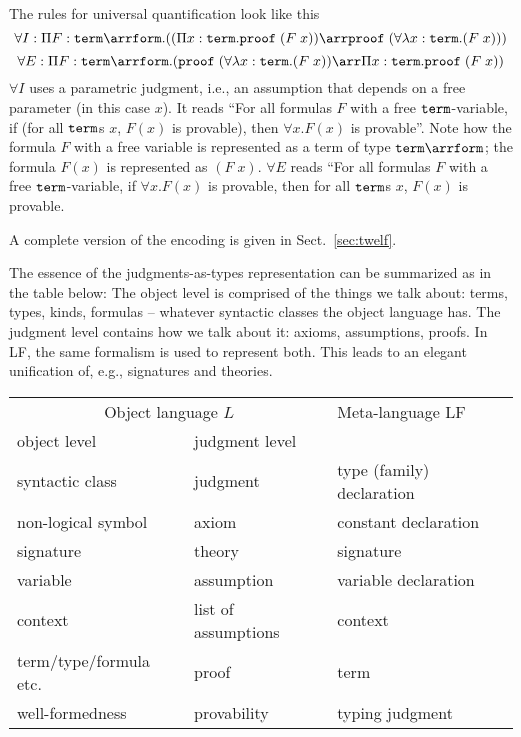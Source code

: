 The rules for universal quantification look like this
\[\forall I:\P{F}{\TERM\arr\FORM}((\P{x}{\TERM}\PROOF\;(F\;x))\arr \PROOF\;(\forall \lam{x}{\TERM}(F\;x)))\]
\[\forall E:\P{F}{\TERM\arr\FORM}(\PROOF\;(\forall \lam{x}{\TERM}(F\;x))\arr\P{x}{\TERM}\PROOF\;(F\;x))\]
$\forall I$ uses a parametric judgment, i.e., an assumption that depends on a free parameter (in this case $x$). It reads ``For all formulas $F$ with a free $\mathtt{term}$-variable, if (for all $\mathtt{term}$s $x$, $F(x)$ is provable), then $\forall x.F(x)$ is provable''. Note how the formula $F$ with a free variable is represented as a term of type $\TERM\arr\FORM$; the formula $F(x)$ is represented as $(F\;x)$. $\forall E$ reads ``For all formulas $F$ with a free $\mathtt{term}$-variable, if $\forall x.F(x)$ is provable, then for all $\mathtt{term}$s $x$, $F(x)$ is provable.

A complete version of the encoding is given in Sect.~\ref{sec:twelf}.

The essence of the judgments-as-types representation can be summarized as in the table below: The object level is comprised of the things we talk about: terms, types, kinds, formulas -- whatever syntactic classes the object language has. The judgment level contains how we talk about it: axioms, assumptions, proofs. In LF, the same formalism is used to represent both. This leads to an elegant unification of, e.g., signatures and theories.

\begin{center}
\begin{tabular}{|ll|l|}
\hline
\multicolumn{2}{|c|}{Object language $L$} & Meta-language LF \\
object level & judgment level            & \\
\hline
syntactic class     & judgment           & type (family) declaration \\
non-logical symbol  & axiom              & constant declaration \\
signature           & theory             & signature \\
\hline
variable            & assumption         & variable declaration \\
context             & list of assumptions& context \\
\hline
term/type/formula etc.& proof            & term \\
well-formedness     & provability        & typing judgment \\
\hline
\end{tabular}
\end{center}

